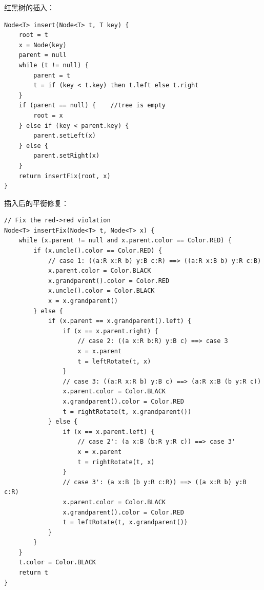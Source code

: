 \documentclass[b5paper]{ctexart}
\begin{document}
红黑树的插入：

\begin{lstlisting}[language = Bourbaki]
Node<T> insert(Node<T> t, T key) {
    root = t
    x = Node(key)
    parent = null
    while (t != null) {
        parent = t
        t = if (key < t.key) then t.left else t.right
    }
    if (parent == null) {    //tree is empty
        root = x
    } else if (key < parent.key) {
        parent.setLeft(x)
    } else {
        parent.setRight(x)
    }
    return insertFix(root, x)
}
\end{lstlisting}

插入后的平衡修复：

\begin{lstlisting}[language = Bourbaki]
// Fix the red->red violation
Node<T> insertFix(Node<T> t, Node<T> x) {
    while (x.parent != null and x.parent.color == Color.RED) {
        if (x.uncle().color == Color.RED) {
            // case 1: ((a:R x:R b) y:B c:R) ==> ((a:R x:B b) y:R c:B)
            x.parent.color = Color.BLACK
            x.grandparent().color = Color.RED
            x.uncle().color = Color.BLACK
            x = x.grandparent()
        } else {
            if (x.parent == x.grandparent().left) {
                if (x == x.parent.right) {
                    // case 2: ((a x:R b:R) y:B c) ==> case 3
                    x = x.parent
                    t = leftRotate(t, x)
                }
                // case 3: ((a:R x:R b) y:B c) ==> (a:R x:B (b y:R c))
                x.parent.color = Color.BLACK
                x.grandparent().color = Color.RED
                t = rightRotate(t, x.grandparent())
            } else {
                if (x == x.parent.left) {
                    // case 2': (a x:B (b:R y:R c)) ==> case 3'
                    x = x.parent
                    t = rightRotate(t, x)
                }
                // case 3': (a x:B (b y:R c:R)) ==> ((a x:R b) y:B c:R)
                x.parent.color = Color.BLACK
                x.grandparent().color = Color.RED
                t = leftRotate(t, x.grandparent())
            }
        }
    }
    t.color = Color.BLACK
    return t
}
\end{lstlisting}
\end{document}
